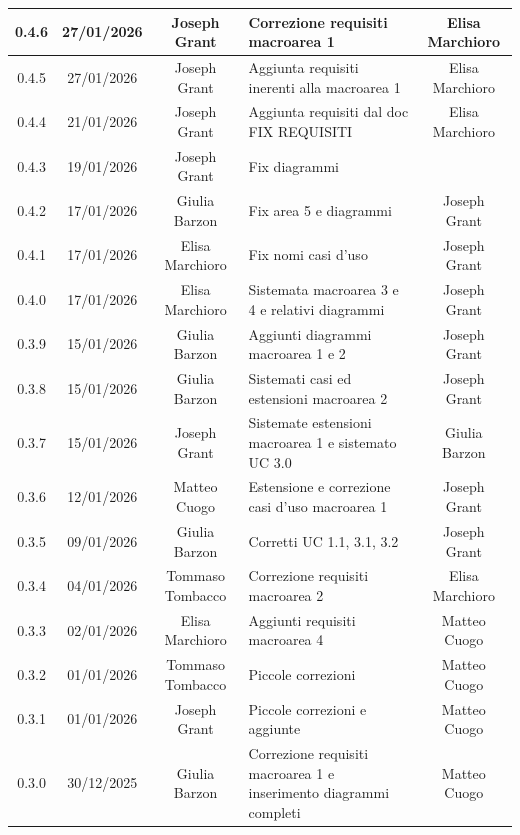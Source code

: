 \documentclass[11pt,a4paper]{article}
\begin{document}
\begin{longtable}[H]{|c|c|c|>{\raggedright\arraybackslash}p{}|c|}
        \hline
        0.4.6 & 27/01/2026 & Joseph Grant & Correzione requisiti macroarea 1 & Elisa Marchioro\\
        \hline
        0.4.5 & 27/01/2026 & Joseph Grant & Aggiunta requisiti inerenti alla macroarea 1 & Elisa Marchioro\\
        \hline
        0.4.4 & 21/01/2026 & Joseph Grant & Aggiunta requisiti dal doc FIX REQUISITI & Elisa Marchioro \\
        \hline
        0.4.3 & 19/01/2026 & Joseph Grant & Fix diagrammi &  \\
        \hline
        0.4.2 & 17/01/2026 & Giulia Barzon & Fix area 5 e diagrammi & Joseph Grant \\
        \hline
        0.4.1 & 17/01/2026 & Elisa Marchioro & Fix nomi casi d'uso & Joseph Grant \\
        \hline
        0.4.0 & 17/01/2026 & Elisa Marchioro & Sistemata macroarea 3 e 4 e relativi diagrammi & Joseph Grant \\
        \hline
        0.3.9 & 15/01/2026 & Giulia Barzon & Aggiunti diagrammi macroarea 1 e 2 & Joseph Grant \\
        \hline
        0.3.8 & 15/01/2026 & Giulia Barzon & Sistemati casi ed estensioni macroarea 2 & Joseph Grant \\
        \hline
        0.3.7 & 15/01/2026 & Joseph Grant & Sistemate estensioni macroarea 1 e sistemato UC 3.0 & Giulia Barzon\\
        \hline
        0.3.6 & 12/01/2026 & Matteo Cuogo & Estensione e correzione casi d'uso macroarea 1 & Joseph Grant\\
        \hline
        0.3.5 & 09/01/2026 & Giulia Barzon & Corretti UC 1.1, 3.1, 3.2 & Joseph Grant\\
        \hline
        0.3.4 & 04/01/2026 & Tommaso Tombacco & Correzione requisiti macroarea 2 & Elisa Marchioro\\
        \hline
        0.3.3 & 02/01/2026 & Elisa Marchioro & Aggiunti requisiti macroarea 4 &  Matteo Cuogo\\
        \hline
        0.3.2 & 01/01/2026 & Tommaso Tombacco & Piccole correzioni & Matteo Cuogo\\
        \hline
        0.3.1 & 01/01/2026 & Joseph Grant & Piccole correzioni e aggiunte &  Matteo Cuogo\\
        \hline
        0.3.0 & 30/12/2025 & Giulia Barzon & Correzione requisiti macroarea 1 e inserimento diagrammi completi & Matteo Cuogo \\

\end{longtable}
\end{document}
